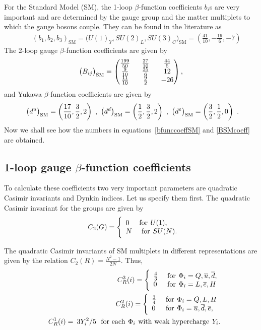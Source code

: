 \documentclass[11pt,prd,superscriptaddress,nofootinbib]{revtex4-1}
\def\sbar{\overline}
\numberwithin{equation}{section}
\newcommand{\be}{\begin{equation}}
\newcommand{\ee}{\end{equation}}
\newcommand{\bea}{\begin{eqnarray}}
\newcommand{\eea}{\end{eqnarray}}
\def\b{\beta}
\begin{document}
For the Standard Model (SM), the 1-loop $\b$-function coefficients $b_i$s are very important and are
determined by the gauge group and the matter multiplets to which the gauge bosons couple. They can be found in the literature as \cite{Machacek:1983tz}
\begin{eqnarray}
\label{bfunccoeffSM}
&&(b_1, b_2, b_3)_{\mathrm{SM}}=\bigg(U(1)_Y, SU(2)_L, SU(3)_C\bigg)_{\mathrm{SM}} =  \left(\frac{41}{10},-\frac{19}{6},-7\right) 
\end{eqnarray}
\noindent
The 2-loop gauge $\b$-function coefficients are given by \cite{Machacek:1983tz, Martin:1993zk}
\be
\label{BSMcoeff}
\big(B_{ij}\big)_{\rm SM}=\begin{pmatrix}
\frac{199}{50}&
~~\frac{27}{10}& ~~\frac{44}{5}\cr \frac{9}{10} & ~~\frac{35}{6}& ~~12 \cr
\frac{11}{10}& ~~\frac{9}{2}& ~~-26
\end{pmatrix}, 
\ee
and Yukawa $\b$-function coefficients are given by
\bea
\label{YukSMcoeff}
&&\big(d^u\big)_{\rm{SM}}=\left(\frac{17}{10},\frac{3}{2},2\right) ~,~
\big(d^d\big)_{\rm{SM}}=\left(\frac{1}{2},\frac{3}{2},2\right) ~,~
\big(d^e\big)_{\rm{SM}}=\left(\frac{3}{2},\frac{1}{2},0\right) ~.~\,
\eea
Now we shall see how the numbers in equations~\ref{bfunccoeffSM} and \ref{BSMcoeff} are obtained.



\subsection{1-loop gauge $\b$-function coefficients}

To calculate these coefficients two very important parameters are quadratic Casimir invariants and Dynkin indices. Let us specify them first. The quadratic Casimir invariant for the groups are given by
\bea
&&
C_2(G) =
\Biggl \{ \begin{array}{ll}
0 & {\rm for}\>\, U(1),
\\
N & {~\rm for}\>\, SU(N).
\end{array}
\label{CasGrp}
\eea

\noindent
The quadratic Casimir invariants of SM multiplets in different representations are given by the relation $C_2(R)=\frac{N^2-1}{2N}$. Thus,
\bea
&&
C^3_R(i) =
\Biggl \{ \begin{array}{ll}
\frac{4}{3} & {~\rm for}\>\,\Phi_i = Q, \sbar u, \sbar d,
\\
0 & {~\rm for}\>\,\Phi_i = L, \sbar e, H
\end{array}
\label{defC1}
\\
&&
C^2_R(i) =
\Biggl \{ \begin{array}{ll}
\frac{3}{4} & {~\rm for}\>\,\Phi_i = Q, L, H\\
0 & {~\rm for}\>\,\Phi_i = \sbar u, \sbar d, \sbar e
,\end{array}
\label{defC2}
\\
&&
C^1_R(i) = \>
3 Y_i^2/5 \>\>\>{\rm for~each}\>\,\Phi_i\>\,{\rm
with~weak~hypercharge}\>\, Y_i.
\label{defC3}
\eea
\end{document}
